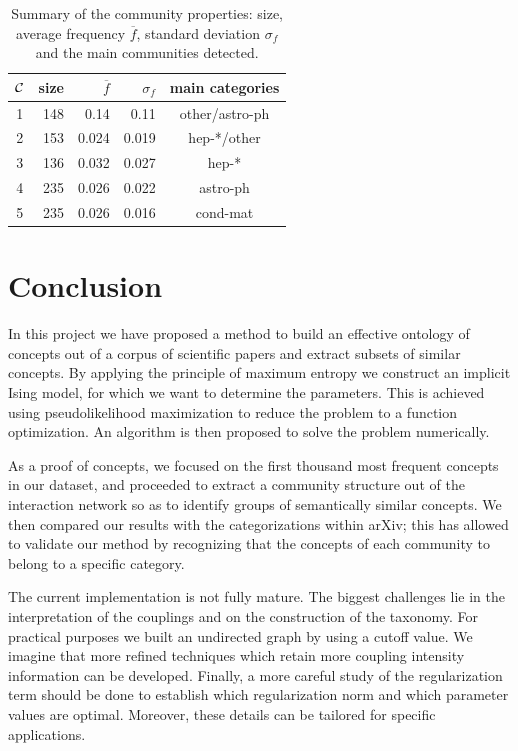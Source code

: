 \documentclass[a4paper,12pt,twoside]{article}
\begin{document}
\begin{table}
  \begin{center}
    \begin{tabular}{c|rrrc}
    $\cal C$ & size & $\overline{f}$ &  $\sigma_f$ & main categories\\
    \hline
    1 & 148 & 0.14 & 0.11  & 	other/astro-ph\\
    2 & 153 & 0.024 & 0.019 &  	hep-*/other\\
    3 & 136 & 0.032 & 0.027 & 	hep-*\\
    4 & 235 & 0.026 & 0.022 &	astro-ph \\
    5 & 235 & 0.026 & 0.016 &	cond-mat\\

    \end{tabular}
  \caption{\label{tab:commprop} Summary of the community properties: size, average frequency $\overline{f}$, standard deviation $\sigma_f$ and the main communities detected.}
  \end{center}
\end{table} 

\section{Conclusion}
In this project we have proposed a method to build an effective ontology of concepts out of a corpus of scientific papers and extract subsets of similar concepts.
By applying the principle of maximum entropy we construct an implicit Ising model, for which we want to determine the parameters.
This is achieved using pseudolikelihood maximization to reduce the problem to a function optimization.
An algorithm is then proposed to solve the problem numerically.

As a proof of concepts, we focused on the first thousand most frequent concepts in our dataset, and proceeded to extract a community structure out of the interaction network so as to identify groups of semantically similar concepts.
We then compared our results with the categorizations within arXiv; this has allowed to validate our method by recognizing that the concepts of each community to belong to a specific category.

The current implementation is not fully mature. 
The biggest challenges lie in the interpretation of the couplings and on the construction of the taxonomy.
For practical purposes we built an undirected graph by using a cutoff value. 
We imagine that more refined techniques which retain more coupling intensity information can be developed. 
Finally, a more careful study of the regularization term should be done to establish which regularization norm and which parameter values are optimal.
Moreover, these details can be tailored for specific applications.
\end{document}
